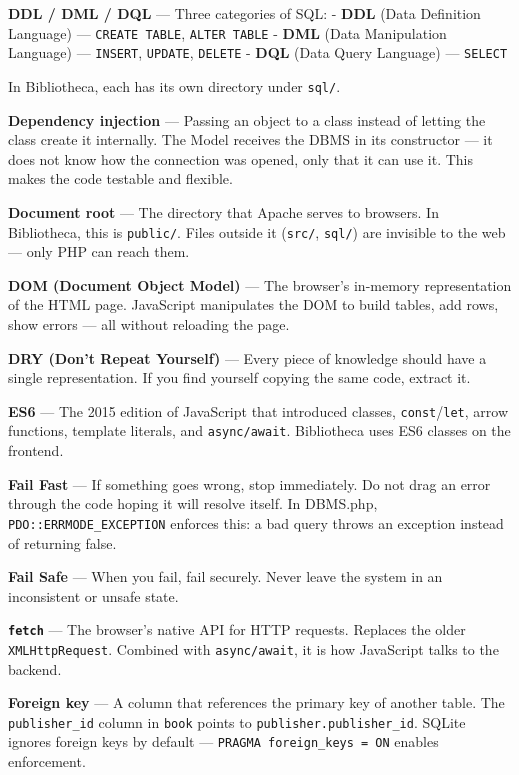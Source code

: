 \documentclass[11pt,a4paper,oneside]{book}
\begin{document}
\textbf{DDL / DML / DQL} --- Three categories of SQL: -
\textbf{DDL} (Data Definition Language) ---
\texttt{CREATE\ TABLE}, \texttt{ALTER\ TABLE} - \textbf{DML}
(Data Manipulation Language) --- \texttt{INSERT},
\texttt{UPDATE}, \texttt{DELETE} - \textbf{DQL} (Data Query
Language) --- \texttt{SELECT}

In Bibliotheca, each has its own directory under \texttt{sql/}.

\textbf{Dependency injection} --- Passing an object to a class
instead of letting the class create it internally. The Model
receives the DBMS in its constructor --- it does not know how the
connection was opened, only that it can use it. This makes the
code testable and flexible.

\textbf{Document root} --- The directory that Apache serves to
browsers. In Bibliotheca, this is \texttt{public/}. Files outside
it (\texttt{src/}, \texttt{sql/}) are invisible to the web ---
only PHP can reach them.

\textbf{DOM (Document Object Model)} --- The browser's in-memory
representation of the HTML page. JavaScript manipulates the DOM
to build tables, add rows, show errors --- all without reloading
the page.

\textbf{DRY (Don't Repeat Yourself)} --- Every piece of knowledge
should have a single representation. If you find yourself copying
the same code, extract it.

\textbf{ES6} --- The 2015 edition of JavaScript that introduced
classes, \texttt{const}/\texttt{let}, arrow functions, template
literals, and \texttt{async/await}. Bibliotheca uses ES6 classes
on the frontend.

\textbf{Fail Fast} --- If something goes wrong, stop immediately.
Do not drag an error through the code hoping it will resolve
itself. In DBMS.php, \texttt{PDO::ERRMODE\_EXCEPTION} enforces
this: a bad query throws an exception instead of returning false.

\textbf{Fail Safe} --- When you fail, fail securely. Never leave
the system in an inconsistent or unsafe state.

\textbf{\texttt{fetch}} --- The browser's native API for HTTP
requests. Replaces the older \texttt{XMLHttpRequest}. Combined
with \texttt{async/await}, it is how JavaScript talks to the
backend.

\textbf{Foreign key} --- A column that references the primary key
of another table. The \texttt{publisher\_id} column in
\texttt{book} points to \texttt{publisher.publisher\_id}. SQLite
ignores foreign keys by default ---
\texttt{PRAGMA\ foreign\_keys\ =\ ON} enables enforcement.
\end{document}
